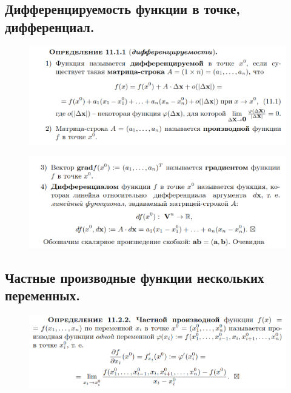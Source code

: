 \documentclass{article}
\begin{document}
\subsection{Дифференцируемость функции в точке, дифференциал.}
\vspace{-0.5cm}
\begin{figure}[h!]
    \centering
    \includegraphics[width=\textwidth]{33.png}
    \vspace{-1.5cm}
\end{figure}

\begin{figure}[h!]
    \centering
    \includegraphics[width=\textwidth]{34.png}
    \vspace{-1cm}
\end{figure}
\newpage
\subsection{Частные производные функции нескольких переменных.}
\begin{figure}[h!]
    \centering
    \includegraphics[width=\textwidth]{40.png}
    \vspace{-1.5cm}
\end{figure}
\end{document}
